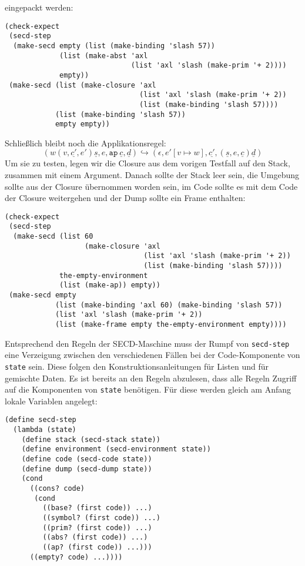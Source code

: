 eingepackt werden:
%
\begin{lstlisting}
(check-expect
 (secd-step
  (make-secd empty (list (make-binding 'slash 57))
             (list (make-abst 'axl 
                              (list 'axl 'slash (make-prim '+ 2))))
             empty))
 (make-secd (list (make-closure 'axl
                                (list 'axl 'slash (make-prim '+ 2))
                                (list (make-binding 'slash 57))))
            (list (make-binding 'slash 57))
            empty empty))
\end{lstlisting}
%
Schließlich bleibt noch die Applikationsregel:
%
\begin{displaymath}
  (w (v,\underline{c'}, e') \underline{s}, e, \mathtt{ap}~\underline{c}, \underline{d})
  \hookrightarrow
  (\epsilon, e'[v\mapsto w], \underline{c'}, (\underline{s}, e, \underline{c}) \underline{d})
\end{displaymath}
%
Um sie zu testen, legen wir die Closure aus dem vorigen Testfall auf
den Stack, zusammen mit einem Argument.  Danach sollte der Stack leer
sein, die Umgebung sollte aus der Closure übernommen worden sein, im
Code sollte es mit dem Code der Closure weitergehen und der Dump
sollte ein Frame enthalten:
%
\begin{lstlisting}
(check-expect
 (secd-step
  (make-secd (list 60
                   (make-closure 'axl
                                 (list 'axl 'slash (make-prim '+ 2))
                                 (list (make-binding 'slash 57))))
             the-empty-environment
             (list (make-ap)) empty))
 (make-secd empty
            (list (make-binding 'axl 60) (make-binding 'slash 57))
            (list 'axl 'slash (make-prim '+ 2))
            (list (make-frame empty the-empty-environment empty))))
\end{lstlisting}
%
Entsprechend den Regeln der SECD-Maschine muss der Rumpf von
\lstinline{secd-step}
eine Verzeigung zwischen den verschiedenen Fällen bei der
Code-Komponente von \lstinline{state} sein.  Diese folgen den
Konstruktionsanleitungen für Listen und für gemischte Daten.  Es ist
bereits an den Regeln abzulesen, dass alle Regeln Zugriff auf die
Komponenten von \lstinline{state} benötigen.  Für diese werden gleich am
Anfang lokale Variablen angelegt:
%
\begin{lstlisting}
(define secd-step
  (lambda (state)
    (define stack (secd-stack state))
    (define environment (secd-environment state))
    (define code (secd-code state))
    (define dump (secd-dump state))
    (cond
      ((cons? code)
       (cond
         ((base? (first code)) ...)
         ((symbol? (first code)) ...)
         ((prim? (first code)) ...)
         ((abs? (first code)) ...)
         ((ap? (first code)) ...)))
      ((empty? code) ...))))
\end{lstlisting}
